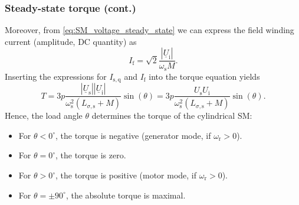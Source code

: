 \begin{frame}
	\frametitle{Steady-state torque (cont.)} 
	\onslide<+->
	Moreover, from \eqref{eq:SM_voltage_steady_state} we can express the field winding current (amplitude, DC quantity) as
	\begin{equation}
		I_\mathrm{f} = \sqrt{2}\frac{\left|\underline{U}_\mathrm{i}\right|}{\omega_\mathrm{s}M}.
	\end{equation}
	\onslide<+->
	Inserting the expressions for $I_\mathrm{s,q}$ and $I_\mathrm{f}$ into the torque equation yields
	\begin{equation}
		T = 3 p \frac{\left|\underline{U}_\mathrm{s}\right| \left|\underline{U}_\mathrm{i}\right|}{\omega_\mathrm{s}^2 \left(L_{\sigma,\mathrm{s}} + M\right)}  \sin(\theta)  = 3 p \frac{U_\mathrm{s} U_\mathrm{i}}{\omega_\mathrm{s}^2 \left(L_{\sigma,\mathrm{s}} + M\right)}  \sin(\theta). 
		\label{eq:SM_torque_steady_state}
	\end{equation}
	\onslide<+->
	Hence, the load angle $\theta$ determines the torque of the cylindrical SM:
	\begin{itemize}
		\item<+-> For $\theta < 0^\circ$, the torque is negative (generator mode, if $\omega_\mathrm{r}>0$).
		\item<+-> For $\theta = 0^\circ$, the torque is zero.
		\item<+-> For $\theta > 0^\circ$, the torque is positive (motor mode, if $\omega_\mathrm{r}>0$).
		\item<+-> For $\theta = \pm 90^\circ$, the absolute torque is maximal.
	\end{itemize}
\end{frame}

